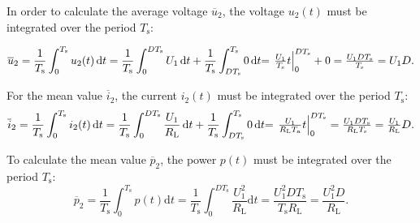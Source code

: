 \begin{solutionblock}
In order to calculate the average voltage $\overline u_2$, the voltage $u_{\mathrm{2}}(t)$ must be integrated over the period $T_{\mathrm{s}}$:

\begin{equation}
    \overline u_2 = \frac{1}{T_{\mathrm{s}}} \int_0^{ T_{\mathrm{s}}} u_2 (t) \, \mathrm{d}t = \frac{1}{ T_{\mathrm{s}}} \int_0^{D T_{\mathrm{s}}} U_1 \, \mathrm{d}t + \frac{1}{ T_{\mathrm{s}}} \int_{D  T_{\mathrm{s}}}^{ T_{\mathrm{s}}} 0 \, \mathrm{d}t$$
    $$= \left . \frac{U_1}{ T_{\mathrm{s}}} t \right |_0^{D  T_{\mathrm{s}}}  + 0 = \frac{U_1 D  T_{\mathrm{s}}}{ T_{\mathrm{s}}} = U_1 D.
\end{equation}

For the mean value $\overline i_2$, the current $i_{\mathrm{2}}(t)$ must be integrated over the period $T_{\mathrm{s}}$:
\begin{equation}
    \overline i_2 = \frac{1}{ T_{\mathrm{s}}} \int_0^{ T_{\mathrm{s}}} i_2(t) \, \mathrm{d}t = \frac{1}{ T_{\mathrm{s}}}\int_0^{D  T_{\mathrm{s}}} \frac{U_1}{ R_{\mathrm{L}}} \, \mathrm{d}t + \frac{1}{ T_{\mathrm{s}}}\int_{D  T_{\mathrm{s}}}^{ T_{\mathrm{s}}} 0 \, \mathrm{d}t$$
    $$= \left . \frac{U_1}{ R_{\mathrm{L}}  T_{\mathrm{a}}}  t \right |_0^{D  T_{\mathrm{s}}} = \frac{U_1 D  T_{\mathrm{s}}}{ R_{\mathrm{L}}  T_{\mathrm{s}}} = \frac{U_1}{ R_{\mathrm{L}}} D.
\end{equation}

To calculate the mean value $\overline{p}_{\mathrm{2}}$, the power $p(t)$ must be integrated over the period $T_{\mathrm{s}}$:
\begin{equation}
    \overline{p}_{\mathrm{2}} = \frac{1}{T_{\mathrm{s}}} \int_0^{T_{\mathrm{s}}} p(t) \mathrm{d}t = \frac{1}{T_{\mathrm{s}}} \int_0^{D T_{\mathrm{s}}} \frac{U_1^2}{ R_{\mathrm{L}}} \mathrm{d}t = \frac{U_1^2 D T_{\mathrm{s}}}{ T_{\mathrm{s}}  R_{\mathrm{L}}} = \frac{U_1^2 D}{ R_{\mathrm{L}}}.
\end{equation}
\end{solutionblock}



